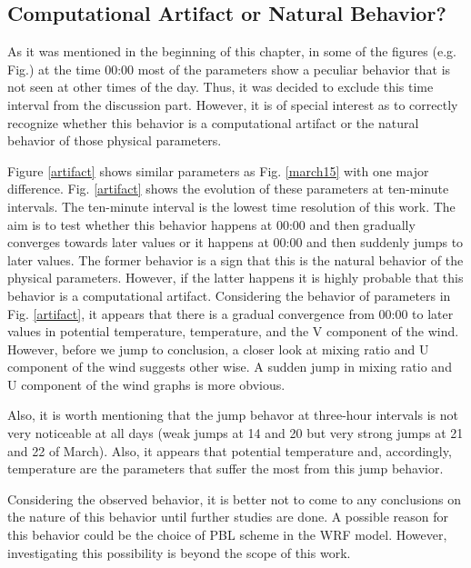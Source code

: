 \documentclass[a4paper,12pt]{article}
\numberwithin{equation}{section} %
\begin{document}
\subsection{Computational Artifact or Natural Behavior?}

As it was mentioned in the beginning of this chapter, in some of the figures (e.g. Fig.) at the time 00:00 most of the parameters show a peculiar behavior that is not seen at other times of the day. Thus, it was decided to exclude this time interval from the discussion part. However, it is of special interest as to correctly recognize whether this behavior is a computational artifact or the natural behavior of those physical parameters. 

Figure \ref{artifact} shows similar parameters as Fig. \ref{march15} with one major difference. Fig. \ref{artifact} shows the evolution of these parameters at ten-minute intervals. The ten-minute interval is the lowest time resolution of this work. The aim is to test whether this behavior happens at 00:00 and then gradually converges towards later values or it happens at 00:00 and then suddenly jumps to later values. The former behavior is a sign that this is the natural behavior of the physical parameters. However, if the latter happens it is highly probable that this behavior is a computational artifact. Considering the behavior of parameters in Fig. \ref{artifact}, it appears that there is a gradual convergence from 00:00 to later values in potential temperature, temperature, and the V component of the wind. However, before we jump to conclusion, a closer look at mixing ratio and U component of the wind suggests other wise. A sudden jump in mixing ratio and U component of the wind graphs is more obvious.

Also, it is worth mentioning that the jump behavor at three-hour intervals is not very noticeable at all days (weak jumps at 14 and 20 but very strong jumps at 21 and 22 of March). Also, it appears that potential temperature and, accordingly, temperature are the parameters that suffer the most from this jump behavior.

Considering the observed behavior, it is better not to come to any conclusions on the nature of this behavior until further studies are done. A possible reason for this behavior could be the choice of PBL scheme in the WRF model. However, investigating this possibility is beyond the scope of this work.

\end{document}
